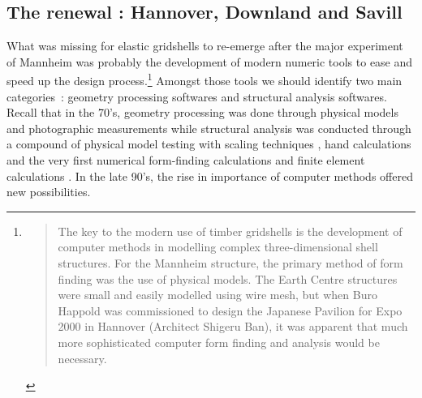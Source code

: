 \subsection{The renewal : Hannover, Downland and Savill}
\label{sec=renewal}

What was missing for elastic gridshells to re-emerge after the major experiment of Mannheim was probably the development of modern numeric tools to ease and speed up the design process.\footnote{\blockcquote[]{Harris2003}{The key to the modern use of timber gridshells is the development of computer methods in modelling complex three-dimensional shell structures. For the Mannheim structure, the primary method of form finding was the use of physical models. The Earth Centre structures were small and easily modelled using wire mesh, but when Buro Happold was commissioned to design the Japanese Pavilion for Expo 2000 in Hannover (Architect Shigeru Ban), it was apparent that much more sophisticated computer form finding and analysis would be necessary.}} Amongst those tools we should identify two main categories~: geometry processing softwares and structural analysis softwares. Recall that in the 70's, geometry processing was done through physical models and photographic measurements \cite[pp.~130-135]{IL10} while structural analysis was conducted through a compound of physical model testing with scaling techniques \cite[pp.~130-135]{IL13}, hand calculations and the very first numerical form-finding calculations \cite[pp.~184-193]{IL10} and finite element calculations \cite[pp.~210-217]{IL10}. In the late 90's, the rise in importance of computer methods offered new possibilities.

